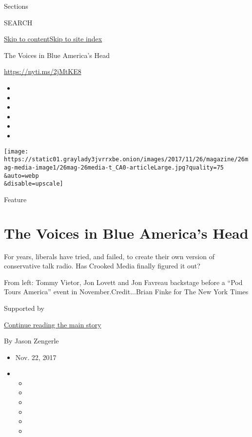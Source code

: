 Sections

SEARCH

\protect\hyperlink{site-content}{Skip to
content}\protect\hyperlink{site-index}{Skip to site index}

The Voices in Blue America's Head

\url{https://nyti.ms/2jMtKE8}

\begin{itemize}
\item
\item
\item
\item
\item
\item
\end{itemize}

\texttt{[image: https://static01.graylady3jvrrxbe.onion/images/2017/11/26/magazine/26mag-media-image1/26mag-26media-t\_CA0-articleLarge.jpg?quality=75\\\&auto=webp\\\&disable=upscale]}

Feature

\hypertarget{the-voices-in-blue-americas-head}{%
\section{The Voices in Blue America's
Head}\label{the-voices-in-blue-americas-head}}

For years, liberals have tried, and failed, to create their own version
of conservative talk radio. Has Crooked Media finally figured it out?

From left: Tommy Vietor, Jon Lovett and Jon Favreau backstage before a
``Pod Tours America'' event in November.Credit...Brian Finke for The New
York Times

Supported by

\protect\hyperlink{after-sponsor}{Continue reading the main story}

By Jason Zengerle

\begin{itemize}
\item
  Nov. 22, 2017
\item
  \begin{itemize}
  \item
  \item
  \item
  \item
  \item
  \item
  \end{itemize}
\end{itemize}

